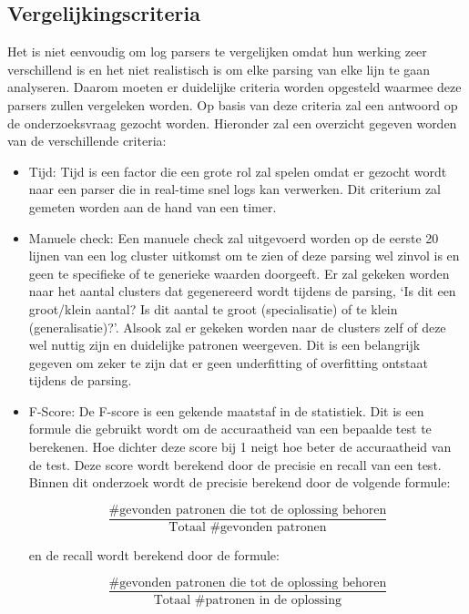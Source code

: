\subsection{Vergelijkingscriteria}
Het is niet eenvoudig om log parsers te vergelijken omdat hun werking zeer verschillend is en het niet realistisch is om elke parsing van elke lijn te gaan analyseren. Daarom moeten er duidelijke criteria worden opgesteld waarmee deze parsers zullen vergeleken worden. Op basis van deze criteria zal een antwoord op de onderzoeksvraag gezocht worden. Hieronder zal een overzicht gegeven worden van de verschillende criteria:
\begin{itemize}
    \item Tijd: Tijd is een factor die een grote rol zal spelen omdat er gezocht wordt naar een parser die in real-time snel logs kan verwerken. Dit criterium zal gemeten worden aan de hand van een timer.
    
    \item Manuele check: Een manuele check zal uitgevoerd worden op de eerste 20 lijnen van een log cluster uitkomst om te zien of deze parsing wel zinvol is en geen te specifieke of te generieke waarden doorgeeft. Er zal gekeken worden naar het aantal clusters dat gegenereerd wordt tijdens de parsing, \lq Is dit een groot/klein aantal? Is dit aantal te groot (specialisatie) of te klein (generalisatie)?\rq. Alsook zal er gekeken worden naar de clusters zelf of deze wel nuttig zijn en duidelijke patronen weergeven. Dit is een belangrijk gegeven om zeker te zijn dat er geen underfitting of overfitting ontstaat tijdens de parsing.\\
    
    \item F-Score: De F-score is een gekende maatstaf in de statistiek. Dit is een formule die gebruikt wordt om de accuraatheid van een bepaalde test te berekenen. Hoe dichter deze score bij 1 neigt hoe beter de accuraatheid van de test. Deze score wordt berekend door de precisie en recall van een test. Binnen dit onderzoek wordt de precisie berekend door de volgende formule: 
    
    \[\frac{\text{\# gevonden patronen die tot de oplossing behoren}}{\text{Totaal \# gevonden patronen}}\]
    
    en de recall wordt berekend door de formule: 
    
    \[\frac{\text{\# gevonden patronen die tot de oplossing behoren}}{\text{Totaal \# patronen in de oplossing}}\]
    

\end{itemize}
